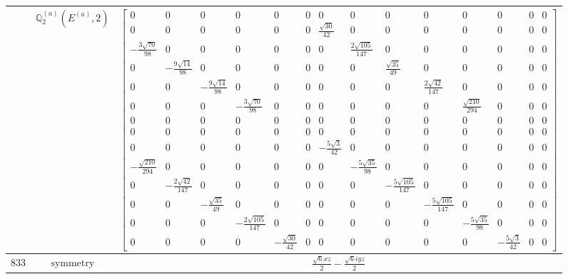 \documentclass[fleqn,8pt,landscape]{jsarticle}
\begin{document}
\begin{longtable}{ccc}
$  $ & $ \mathbb{Q}_{2}^{(a)}(E^{(a)},2) $ & $ \begin{bmatrix} 0 & 0 & 0 & 0 & 0 & 0 & 0 & 0 & 0 & 0 & 0 & 0 & 0 & 0 \\ 0 & 0 & 0 & 0 & 0 & 0 & \frac{\sqrt{30}}{42} & 0 & 0 & 0 & 0 & 0 & 0 & 0 \\ - \frac{3 \sqrt{70}}{98} & 0 & 0 & 0 & 0 & 0 & 0 & \frac{2 \sqrt{105}}{147} & 0 & 0 & 0 & 0 & 0 & 0 \\ 0 & - \frac{9 \sqrt{14}}{98} & 0 & 0 & 0 & 0 & 0 & 0 & \frac{\sqrt{35}}{49} & 0 & 0 & 0 & 0 & 0 \\ 0 & 0 & - \frac{9 \sqrt{14}}{98} & 0 & 0 & 0 & 0 & 0 & 0 & \frac{2 \sqrt{42}}{147} & 0 & 0 & 0 & 0 \\ 0 & 0 & 0 & - \frac{3 \sqrt{70}}{98} & 0 & 0 & 0 & 0 & 0 & 0 & \frac{\sqrt{210}}{294} & 0 & 0 & 0 \\ 0 & 0 & 0 & 0 & 0 & 0 & 0 & 0 & 0 & 0 & 0 & 0 & 0 & 0 \\ 0 & 0 & 0 & 0 & 0 & 0 & 0 & 0 & 0 & 0 & 0 & 0 & 0 & 0 \\ 0 & 0 & 0 & 0 & 0 & 0 & - \frac{5 \sqrt{3}}{42} & 0 & 0 & 0 & 0 & 0 & 0 & 0 \\ - \frac{\sqrt{210}}{294} & 0 & 0 & 0 & 0 & 0 & 0 & - \frac{5 \sqrt{35}}{98} & 0 & 0 & 0 & 0 & 0 & 0 \\ 0 & - \frac{2 \sqrt{42}}{147} & 0 & 0 & 0 & 0 & 0 & 0 & - \frac{5 \sqrt{105}}{147} & 0 & 0 & 0 & 0 & 0 \\ 0 & 0 & - \frac{\sqrt{35}}{49} & 0 & 0 & 0 & 0 & 0 & 0 & - \frac{5 \sqrt{105}}{147} & 0 & 0 & 0 & 0 \\ 0 & 0 & 0 & - \frac{2 \sqrt{105}}{147} & 0 & 0 & 0 & 0 & 0 & 0 & - \frac{5 \sqrt{35}}{98} & 0 & 0 & 0 \\ 0 & 0 & 0 & 0 & - \frac{\sqrt{30}}{42} & 0 & 0 & 0 & 0 & 0 & 0 & - \frac{5 \sqrt{3}}{42} & 0 & 0 \end{bmatrix} $ \\ \hline
$ 833 $ & $ \text{symmetry} $ & $ \frac{\sqrt{6} x z}{2} - \frac{\sqrt{6} i y z}{2} $ \\

\end{longtable}
\end{document}
